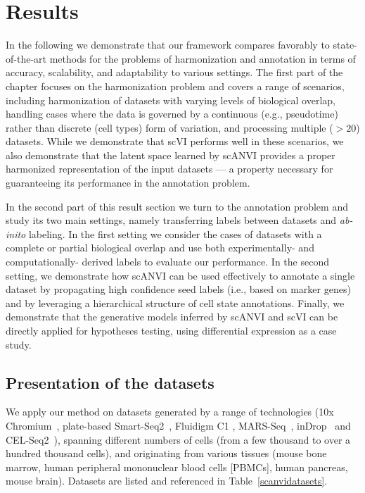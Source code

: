 \section{Results}
In the following we demonstrate that our framework compares favorably to state-of-the-art methods for the problems of harmonization and annotation in terms of accuracy, scalability, and adaptability to various settings. The first part of the chapter focuses on the harmonization problem and covers a range of scenarios, including harmonization of datasets with varying levels of biological overlap, handling cases where the data is governed by a continuous (e.g., pseudotime) rather than discrete (cell types) form of variation, and processing multiple ($> 20$) datasets. While we demonstrate that scVI performs well in these scenarios, we also demonstrate that the latent space learned by scANVI provides a proper harmonized representation of the input datasets --- a property necessary for guaranteeing its performance in the annotation problem. 

In the second part of this result section we turn to the annotation problem and study its two main settings, namely transferring labels between datasets and \textit{ab-inito} labeling. In the first setting we consider the cases of datasets with a complete or partial biological overlap and use both experimentally- and computationally- derived labels to evaluate our performance. In the second setting, we demonstrate how scANVI can be used effectively to annotate a single dataset by propagating high confidence seed labels (i.e., based on marker genes) and by leveraging a hierarchical structure of cell state annotations. Finally, we demonstrate that the generative models inferred by scANVI and scVI can be directly applied for hypotheses testing, using differential expression as a case study. 



\subsection{Presentation of the datasets}
We apply our method on datasets generated by a range of technologies (10x Chromium~\cite{zheng2017massively, 10x}, plate-based Smart-Seq2~\cite{picelli2014SS2}, Fluidigm C1 \cite{fluidigmXin2016}, MARS-Seq~\cite{jaitin2014massively}, inDrop~\cite{klein2015droplet} and CEL-Seq2~\cite{celseq2016}), spanning different numbers of cells (from a few thousand to over a hundred thousand cells), and originating from various tissues (mouse bone marrow, human peripheral mononuclear blood cells [PBMCs], human pancreas, mouse brain). Datasets are listed and referenced in Table~\ref{scanvidatasets}.


